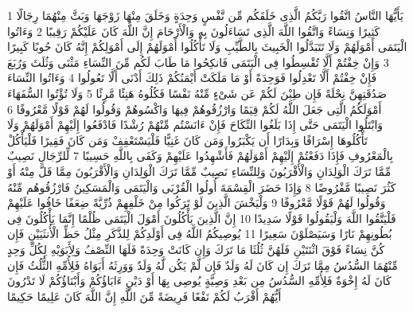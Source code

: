 \documentclass[20pt,a4paper]{article}
\title{}
\author{}
\date{}
\begin{document}
\pagecolor{cl_page}



{\tiny\colorbox{cl_aya}{1}} يَأَيُّهَا النَّاسُ اتَّقُوا رَبَّكُمُ الَّذِى خَلَقَكُم مِّن نَّفْسٍ وَحِدَةٍ وَخَلَقَ مِنْهَا زَوْجَهَا وَبَثَّ مِنْهُمَا رِجَالًا كَثِيرًا وَنِسَاءً وَاتَّقُوا اللَّهَ الَّذِى تَسَاءَلُونَ بِهِ وَالْأَرْحَامَ إِنَّ اللَّهَ كَانَ عَلَيْكُمْ رَقِيبًا
{\tiny\colorbox{cl_aya}{2}} وَءَاتُوا الْيَتَمَى أَمْوَلَهُمْ وَلَا تَتَبَدَّلُوا الْخَبِيثَ بِالطَّيِّبِ وَلَا تَأْكُلُوا أَمْوَلَهُمْ إِلَى أَمْوَلِكُمْ إِنَّهُ كَانَ حُوبًا كَبِيرًا
{\tiny\colorbox{cl_aya}{3}} وَإِنْ خِفْتُمْ أَلَّا تُقْسِطُوا فِى الْيَتَمَى فَانكِحُوا مَا طَابَ لَكُم مِّنَ النِّسَاءِ مَثْنَى وَثُلَثَ وَرُبَعَ فَإِنْ خِفْتُمْ أَلَّا تَعْدِلُوا فَوَحِدَةً أَوْ مَا مَلَكَتْ أَيْمَنُكُمْ ذَلِكَ أَدْنَى أَلَّا تَعُولُوا
{\tiny\colorbox{cl_aya}{4}} وَءَاتُوا النِّسَاءَ صَدُقَتِهِنَّ نِحْلَةً فَإِن طِبْنَ لَكُمْ عَن شَىْءٍ مِّنْهُ نَفْسًا فَكُلُوهُ هَنِئًا مَّرِئًا
{\tiny\colorbox{cl_aya}{5}} وَلَا تُؤْتُوا السُّفَهَاءَ أَمْوَلَكُمُ الَّتِى جَعَلَ اللَّهُ لَكُمْ قِيَمًا وَارْزُقُوهُمْ فِيهَا وَاكْسُوهُمْ وَقُولُوا لَهُمْ قَوْلًا مَّعْرُوفًا
{\tiny\colorbox{cl_aya}{6}} وَابْتَلُوا الْيَتَمَى حَتَّى إِذَا بَلَغُوا النِّكَاحَ فَإِنْ ءَانَسْتُم مِّنْهُمْ رُشْدًا فَادْفَعُوا إِلَيْهِمْ أَمْوَلَهُمْ وَلَا تَأْكُلُوهَا إِسْرَافًا وَبِدَارًا أَن يَكْبَرُوا وَمَن كَانَ غَنِيًّا فَلْيَسْتَعْفِفْ وَمَن كَانَ فَقِيرًا فَلْيَأْكُلْ بِالْمَعْرُوفِ فَإِذَا دَفَعْتُمْ إِلَيْهِمْ أَمْوَلَهُمْ فَأَشْهِدُوا عَلَيْهِمْ وَكَفَى بِاللَّهِ حَسِيبًا
{\tiny\colorbox{cl_aya}{7}} لِّلرِّجَالِ نَصِيبٌ مِّمَّا تَرَكَ الْوَلِدَانِ وَالْأَقْرَبُونَ وَلِلنِّسَاءِ نَصِيبٌ مِّمَّا تَرَكَ الْوَلِدَانِ وَالْأَقْرَبُونَ مِمَّا قَلَّ مِنْهُ أَوْ كَثُرَ نَصِيبًا مَّفْرُوضًا
{\tiny\colorbox{cl_aya}{8}} وَإِذَا حَضَرَ الْقِسْمَةَ أُولُوا الْقُرْبَى وَالْيَتَمَى وَالْمَسَكِينُ فَارْزُقُوهُم مِّنْهُ وَقُولُوا لَهُمْ قَوْلًا مَّعْرُوفًا
{\tiny\colorbox{cl_aya}{9}} وَلْيَخْشَ الَّذِينَ لَوْ تَرَكُوا مِنْ خَلْفِهِمْ ذُرِّيَّةً ضِعَفًا خَافُوا عَلَيْهِمْ فَلْيَتَّقُوا اللَّهَ وَلْيَقُولُوا قَوْلًا سَدِيدًا
{\tiny\colorbox{cl_aya}{10}} إِنَّ الَّذِينَ يَأْكُلُونَ أَمْوَلَ الْيَتَمَى ظُلْمًا إِنَّمَا يَأْكُلُونَ فِى بُطُونِهِمْ نَارًا وَسَيَصْلَوْنَ سَعِيرًا
{\tiny\colorbox{cl_aya}{11}} يُوصِيكُمُ اللَّهُ فِى أَوْلَدِكُمْ لِلذَّكَرِ مِثْلُ حَظِّ الْأُنثَيَيْنِ فَإِن كُنَّ نِسَاءً فَوْقَ اثْنَتَيْنِ فَلَهُنَّ ثُلُثَا مَا تَرَكَ وَإِن كَانَتْ وَحِدَةً فَلَهَا النِّصْفُ وَلِأَبَوَيْهِ لِكُلِّ وَحِدٍ مِّنْهُمَا السُّدُسُ مِمَّا تَرَكَ إِن كَانَ لَهُ وَلَدٌ فَإِن لَّمْ يَكُن لَّهُ وَلَدٌ وَوَرِثَهُ أَبَوَاهُ فَلِأُمِّهِ الثُّلُثُ فَإِن كَانَ لَهُ إِخْوَةٌ فَلِأُمِّهِ السُّدُسُ مِن بَعْدِ وَصِيَّةٍ يُوصِى بِهَا أَوْ دَيْنٍ ءَابَاؤُكُمْ وَأَبْنَاؤُكُمْ لَا تَدْرُونَ أَيُّهُمْ أَقْرَبُ لَكُمْ نَفْعًا فَرِيضَةً مِّنَ اللَّهِ إِنَّ اللَّهَ كَانَ عَلِيمًا حَكِيمًا
\end{document}
